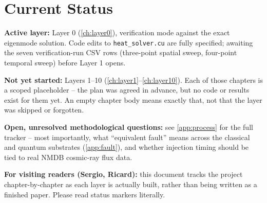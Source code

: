 \section*{Current Status}

\begin{tcolorbox}[title=Status as of \today, colback=green!5, colframe=green!40!black]
\textbf{Active layer:} Layer 0 (\autoref{ch:layer0}), verification mode against the exact eigenmode solution. Code edits to \texttt{heat\_solver.cu} are fully specified; awaiting the seven verification-run CSV rows (three-point spatial sweep, four-point temporal sweep) before Layer 1 opens.

\textbf{Not yet started:} Layers 1--10 (\autoref{ch:layer1}--\autoref{ch:layer10}). Each of those chapters is a scoped placeholder -- the plan was agreed in advance, but no code or results exist for them yet. An empty chapter body means exactly that, not that the layer was skipped or forgotten.

\textbf{Open, unresolved methodological questions:} see \autoref{app:process} for the full tracker -- most importantly, what ``equivalent fault'' means across the classical and quantum substrates (\autoref{app:fault}), and whether injection timing should be tied to real NMDB cosmic-ray flux data.

\textbf{For visiting readers (Sergio, Ricard):} this document tracks the project chapter-by-chapter as each layer is actually built, rather than being written as a finished paper. Please read status markers literally.
\end{tcolorbox}